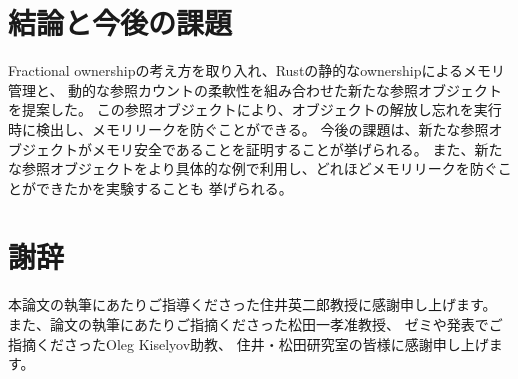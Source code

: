 \documentclass{sumiilab-paper}
\theoremstyle{mystyle}
\numberwithin{definition}{chapter} %
\begin{document}
\chapter{結論と今後の課題}
Fractional ownershipの考え方を取り入れ、Rustの静的なownershipによるメモリ管理と、
動的な参照カウントの柔軟性を組み合わせた新たな参照オブジェクトを提案した。
この参照オブジェクトにより、オブジェクトの解放し忘れを実行時に検出し、メモリリークを防ぐことができる。
今後の課題は、新たな参照オブジェクトがメモリ安全であることを証明することが挙げられる。
また、新たな参照オブジェクトをより具体的な例で利用し、どれほどメモリリークを防ぐことができたかを実験することも
挙げられる。

\backmatter%
\chapter{謝辞}
本論文の執筆にあたりご指導くださった住井英二郎教授に感謝申し上げます。
また、論文の執筆にあたりご指摘くださった松田一孝准教授、
ゼミや発表でご指摘くださったOleg Kiselyov助教、
住井・松田研究室の皆様に感謝申し上げます。


\end{document}
